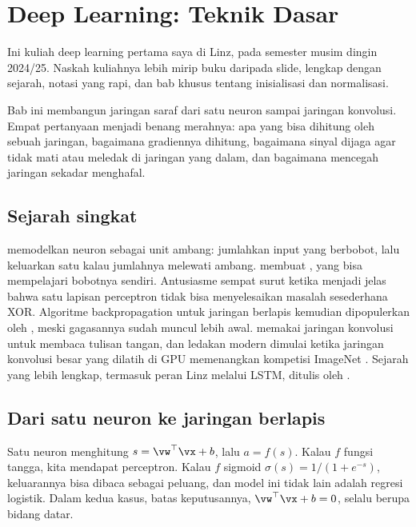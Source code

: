 \chapter{Deep Learning: Teknik Dasar}
\label{ch:dlbasic}

Ini kuliah deep learning pertama saya di Linz, pada semester musim dingin 2024/25. Naskah
kuliahnya lebih mirip buku daripada slide, lengkap dengan sejarah, notasi yang rapi, dan bab
khusus tentang inisialisasi dan normalisasi.

Bab ini membangun jaringan saraf dari satu neuron sampai jaringan konvolusi. Empat pertanyaan
menjadi benang merahnya: apa yang bisa dihitung oleh sebuah jaringan, bagaimana gradiennya
dihitung, bagaimana sinyal dijaga agar tidak mati atau meledak di jaringan yang dalam, dan
bagaimana mencegah jaringan sekadar menghafal.

\section{Sejarah singkat}

\citet{mcculloch1943} memodelkan neuron sebagai unit ambang: jumlahkan input yang berbobot, lalu
keluarkan satu kalau jumlahnya melewati ambang. \citet{rosenblatt1958} membuat
, yang bisa mempelajari bobotnya sendiri. Antusiasme sempat surut ketika
menjadi jelas bahwa satu lapisan perceptron tidak bisa menyelesaikan masalah sesederhana XOR.
Algoritme backpropagation untuk jaringan berlapis kemudian dipopulerkan oleh
\citet{rumelhart1986}, meski gagasannya sudah muncul lebih awal. \citet{lecun1998} memakai jaringan
konvolusi untuk membaca tulisan tangan, dan ledakan modern dimulai ketika jaringan konvolusi
besar yang dilatih di GPU memenangkan kompetisi ImageNet \citep{krizhevsky2017}. Sejarah yang
lebih lengkap, termasuk peran Linz melalui LSTM, ditulis oleh \citet{schmidhuber2015}.

\section{Dari satu neuron ke jaringan berlapis}

Satu neuron menghitung  $s=\vw^\top\vx+b$, lalu 
$a=f(s)$. Kalau $f$ fungsi tangga, kita mendapat perceptron. Kalau $f$ sigmoid
$\sigma(s)=1/(1+e^{-s})$, keluarannya bisa dibaca sebagai peluang, dan model ini tidak lain
adalah regresi logistik. Dalam kedua kasus, batas keputusannya, $\vw^\top\vx+b=0$, selalu berupa
bidang datar.

